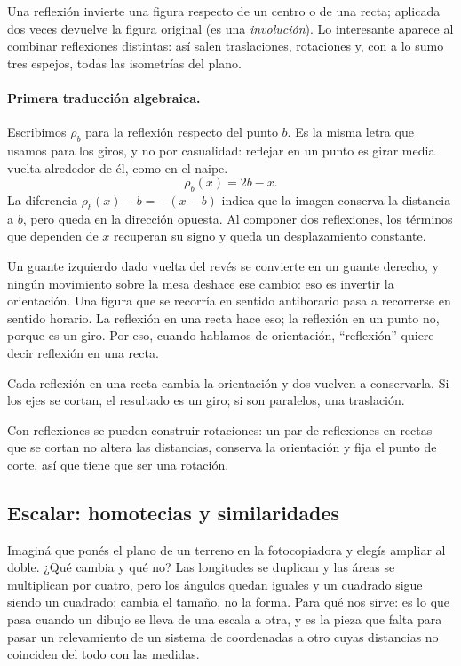 Una reflexión invierte una figura respecto de un centro o de una recta; aplicada dos veces
devuelve la figura original (es una \emph{involución}). Lo interesante aparece al combinar
reflexiones distintas: así salen traslaciones, rotaciones y, con a lo sumo tres espejos, todas
las isometrías del plano.

\paragraph{Primera traducción algebraica.}
Escribimos \(\rho_b\) para la reflexión respecto del punto \(b\). Es la misma letra que usamos
para los giros, y no por casualidad: reflejar en un punto es girar media vuelta alrededor de él,
como en el naipe.
\[
  \rho_b(x)=2b-x.
\]
La diferencia \(\rho_b(x)-b=-(x-b)\) indica que la imagen conserva la distancia a \(b\),
pero queda en la dirección opuesta. Al componer dos reflexiones, los términos que dependen de
\(x\) recuperan su signo y queda un desplazamiento constante.

Un guante izquierdo dado vuelta del revés se convierte en un guante derecho, y ningún
movimiento sobre la mesa deshace ese cambio: eso es invertir la orientación. Una figura que se
recorría en sentido antihorario pasa a recorrerse en sentido horario. La reflexión en una recta
hace eso; la reflexión en un punto no, porque es un giro. Por eso, cuando hablamos de
orientación, \enquote{reflexión} quiere decir reflexión en una recta.

\begin{idea}
Cada reflexión en una recta cambia la orientación y dos vuelven a conservarla. Si los ejes se
cortan, el resultado es un giro; si son paralelos, una traslación.
\end{idea}

\begin{idea}
Con reflexiones se pueden construir rotaciones: un par de reflexiones en rectas que se cortan
no altera las distancias, conserva la orientación y fija el punto de corte, así que tiene que
ser una rotación.
\end{idea}

\subsection{Escalar: homotecias y similaridades}\label{sec:escalar}

Imaginá que ponés el plano de un terreno en la fotocopiadora y elegís ampliar al doble. ¿Qué
cambia y qué no? Las longitudes se duplican y las áreas se multiplican por cuatro, pero los
ángulos quedan iguales y un cuadrado sigue siendo un cuadrado: cambia el tamaño, no la forma.
Para qué nos sirve: es lo que pasa cuando un dibujo se lleva de una escala a otra, y es la pieza
que falta para pasar un relevamiento de un sistema de coordenadas a otro cuyas distancias no
coinciden del todo con las medidas.

